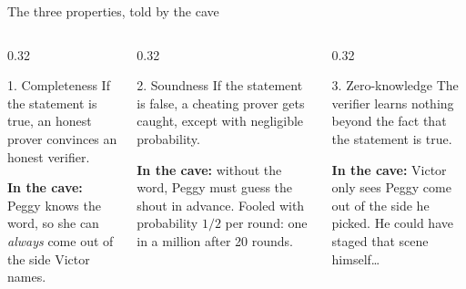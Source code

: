\ifdefined\PRESENTATION\else\PassOptionsToClass{handout}{beamer}\fi\documentclass[aspectratio=169, lualatex]{beamer}
\begin{document}
\begin{frame}{The three properties, told by the cave}
	\begin{columns}[T]
		\begin{column}{0.32\textwidth}
			\begin{block}{1. Completeness}
				If the statement is true, an honest prover convinces an honest verifier.
			\end{block}
			\small\textbf{In the cave:} Peggy knows the word, so she can \textit{always} come out of the side Victor names.
		\end{column}
		\pause
		\begin{column}{0.32\textwidth}
			\begin{block}{2. Soundness}
				If the statement is false, a cheating prover gets caught, except with negligible probability.
			\end{block}
			\small\textbf{In the cave:} without the word, Peggy must guess the shout in advance. Fooled with probability $1/2$ per round: one in a million after 20 rounds.
		\end{column}
		\pause
		\begin{column}{0.32\textwidth}
			\begin{block}{3. Zero-knowledge}
				The verifier learns nothing beyond the fact that the statement is true.
			\end{block}
			\small\textbf{In the cave:} Victor only sees Peggy come out of the side he picked. He could have staged that scene himself\ldots
		\end{column}
	\end{columns}
\end{frame}
\end{document}
